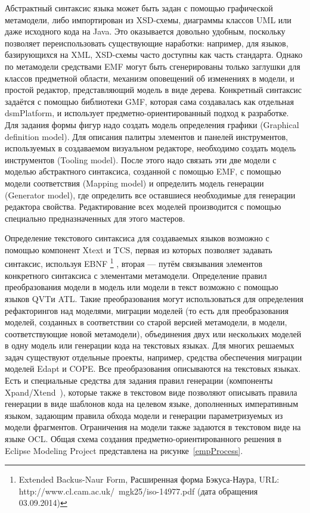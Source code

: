 Абстрактный синтаксис языка может быть задан с помощью графической метамодели, либо 
импортирован из XSD-схемы, диаграммы классов UML или даже исходного кода на Java. 
Это оказывается довольно удобным, поскольку позволяет переиспользовать существующие 
наработки: например, для языков, базирующихся на XML, XSD-схемы часто доступны как 
часть стандарта. Однако по метамодели средствами EMF могут быть сгенерированы только 
заглушки для классов предметной области, механизм оповещений об изменениях в модели, 
и простой редактор, представляющий модель в виде дерева. Конкретный синтаксис задаётся
с помощью библиотеки GMF, которая сама создавалась как отдельная \ac{dsmPlatform}, и использует 
предметно-ориентированный подход к разработке. Для задания формы фигур надо создать 
модель определения графики (Graphical definition model). Для описания палитры элементов 
и панелей инструментов, используемых в создаваемом визуальном редакторе, необходимо 
создать модель инструментов (Tooling model). После этого надо связать эти две модели 
с моделью абстрактного синтаксиса, созданной с помощью EMF, с помощью модели соответствия 
(Mapping model) и определить модель генерации (Generator model), где определить все 
оставшиеся необходимые для генерации редактора свойства. Редактирование всех моделей 
производится с помощью специально предназначенных для этого мастеров.

Определение текстового синтаксиса для создаваемых языков возможно с помощью компонент 
Xtext и TCS, первая из которых позволяет задавать синтаксис, используя EBNF%
\footnote{Extended Backus-Naur Form, Расширенная форма Бэкуса-Наура, URL: http://www.cl.cam.ac.uk/~mgk25/iso-14977.pdf (дата обращения 03.09.2014)}%
, вторая --- путём связывания элементов конкретного синтаксиса с элементами метамодели. Определение 
правил преобразования модели в модель или модели в текст возможно с помощью языков 
QVTи ATL. Такие преобразования могут использоваться для определения рефакторингов 
над моделями, миграции моделей (то есть для преобразования моделей, созданных в соответствии 
со старой версией метамодели, в модели, соответствующие новой метамодели), объединения 
двух или нескольких моделей в одну модель или генерации кода на текстовых языках. 
Для многих решаемых задач существуют отдельные проекты, например, средства обеспечения
миграции моделей Edapt и COPE.
Все преобразования описываются на текстовых языках. Есть и специальные средства для задания правил генерации 
(компоненты Xpand/Xtend~\cite{xpand}), которые также в текстовом виде позволяют описывать 
правила генерации в виде шаблонов кода на целевом языке, дополненных императивным языком, задающим 
правила обхода модели и генерации параметризуемых из модели фрагментов. Ограничения на модели 
также задаются в текстовом виде на языке OCL. Общая схема создания предметно-ориентированного 
решения в Eclipse Modeling Project представлена на рисунке~\ref{empProcess}.

